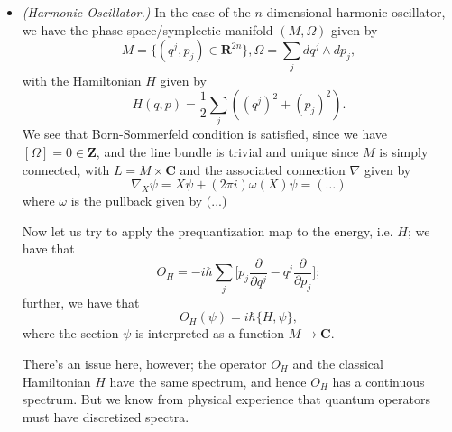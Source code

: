 \documentclass{tufte-handout}
\begin{document}
\begin{itemize}
\item \emph{(Harmonic Oscillator.)} In the case of the $n$-dimensional harmonic oscillator, we have the phase space/symplectic manifold $(M,\Omega)$ given by
$$
M = \{(q^j,p_j) \in \mathbf{R}^{2n}\}, \Omega = \sum_j dq^j \wedge dp_j,
$$
with the Hamiltonian $H$ given by
$$
H(q,p) = \frac{1}{2}\sum_j ((q^j)^2 + (p_j)^2).
$$
We see that Born-Sommerfeld condition is satisfied, since we have $[\Omega] = 0 \in \mathbf{Z}$, and the line bundle is trivial and unique since $M$ is simply connected, with $L = M \times \mathbf{C}$ and the associated connection $\nabla$ given by
$$
\nabla_X \psi = X \psi + (2\pi i)\omega(X)\psi = (\ldots)%
$$
where $\omega$ is the pullback given by (...)%

Now let us try to apply the prequantization map to the energy, i.e. $H$; we have that
$$
O_H = -i\hbar\sum_j\biggl[p_j\frac{\partial}{\partial q^j} - q^j\frac{\partial}{\partial p_j} \biggr];
$$
further, we have that
$$
O_H(\psi) = i\hbar\{H,\psi\},
$$
where the section $\psi$ is interpreted as a function $M \to \mathbf{C}$.

There's an issue here, however; the operator $O_H$ and the classical Hamiltonian $H$ have the same spectrum, and hence $O_H$ has a continuous spectrum. But we know from physical experience that quantum operators must have discretized spectra.
\end{itemize}













\end{document}
